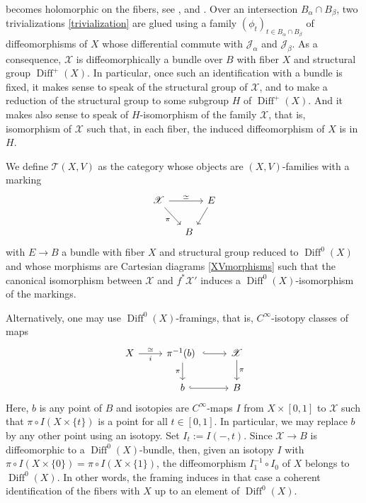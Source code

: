 \documentclass[10pt]{amsart}
\let\mathcal\mathscr
\DeclareMathOperator{\Diff}{Diff}
\theoremstyle{plain}
\theoremstyle{definition}
\theoremstyle{remark}
\numberwithin{equation}{section}
\newcommand{\D}{\Diff^0(X)}
\begin{document}
becomes holomorphic on the fibers, see \cite[Th.\,4.5]{Cat}, \cite[\S 2.3]{circle} and \cite[Prop.\,1]{DouadyBourbaki}. Over an intersection $B_\alpha\cap B_\beta$, two trivializations \eqref{trivialization} are glued using a family $(\phi_t)_{t\in B_\alpha\cap B_\beta}$ of diffeomorphisms of $X$ whose differential commute with $\mathcal J_\alpha$ and $\mathcal J_\beta$. As a consequence, $\mathcal X$ is diffeomorphically a bundle over $B$ with fiber $X$ and structural group $\Diff^+(X)$. In particular, once such an identification with a bundle is fixed, it makes sense to speak of the structural group of $\mathcal X$, and to make a reduction of the structural group to some subgroup $H$ of $\Diff^+(X)$. And it makes also sense to speak of $H$-isomorphism of the family $\mathcal X$, that is, isomorphism of $\mathcal X$ such that, in each fiber, the induced diffeomorphism of $X$ is in $H$.

We define $\mathcal T(X,V)$ as the category whose objects are $(X,V)$-families with a marking\vspace*{-3pt}
\begin{equation}
\label{XVfamilymarked}
\begin{tikzcd}[column sep=tiny, row sep=normal]
\mathcal X\arrow[rrr,"\simeq"] \arrow[rrd, end anchor = north west,"\pi"'] &&&E\arrow[dl, end anchor = north east]\\
&&B&
\end{tikzcd}
\end{equation}
with $E\to B$ a bundle with fiber $X$ and structural group reduced to $\Diff^0(X)$ and whose morphisms are Cartesian diagrams \eqref{XVmorphisms} such that the canonical isomorphism between $\mathcal X$ and $f^*\mathcal X'$ induces a $\Diff^0(X)$-isomorphism of the markings.

Alternatively, one may use $\D$-framings, that is, $C^\infty$-isotopy classes of maps%
\begin{equation}
\begin{tikzcd}
X \arrow[r,"\simeq", "i"']&\pi^{-1}(b)\ \arrow[d,swap,"\pi"]\arrow[r,hook]&\mathcal X\arrow[d,"\pi"]\\
&b\arrow[r,hook] &B
\end{tikzcd}
\end{equation}
Here, $b$ is any point of $B$ and isotopies are $C^\infty$-maps $I$ from $X\times [0,1]$ to $\mathcal X$ such that $\pi\circ I(X\times\{t\})$ is a point for all $t\in [0,1]$. In particular, we may replace $b$ by any other point using an isotopy. Set $I_t:=I(-,t)$. Since $\mathcal X\to B$ is diffeomorphic to a $\D$-bundle, then, given an isotopy $I$ with $\pi\circ I(X\times\{0\})=\pi\circ I(X\times\{1\})$, the diffeomorphism $I_1^{-1}\circ I_0$ of $X$ belongs to $\D$. In other words, the framing induces in that case a coherent identification of the fibers with $X$ up to an element of $\D$.
\end{document}
